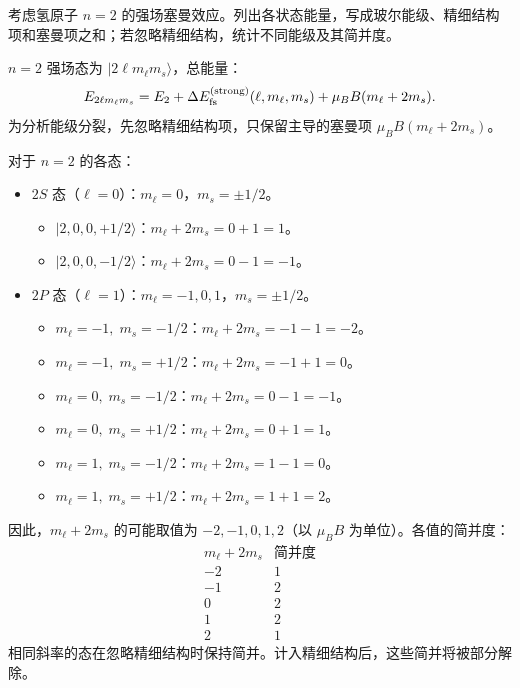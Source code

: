 \begin{question}
考虑氢原子 $n=2$ 的强场塞曼效应。列出各状态能量，写成玻尔能级、精细结构项和塞曼项之和；若忽略精细结构，统计不同能级及其简并度。
\end{question}
\begin{solution}
$n=2$ 强场态为 $|2\ell m_\ell m_s\rangle$，总能量：
\[
E_{2\ell m_\ell m_s}=E_2+\Delta E_{\rm fs}^{\rm(strong)}(\ell,m_\ell,m_s)+\mu_B B(m_\ell+2m_s).
\]
为分析能级分裂，先忽略精细结构项，只保留主导的塞曼项 $\mu_BB(m_\ell+2m_s)$。

对于 $n=2$ 的各态：
\begin{itemize}
\item $2S$ 态（$\ell=0$）：$m_\ell=0$，$m_s=\pm1/2$。
  \begin{itemize}
  \item $|2,0,0,+1/2\rangle$：$m_\ell+2m_s=0+1=1$。
  \item $|2,0,0,-1/2\rangle$：$m_\ell+2m_s=0-1=-1$。
  \end{itemize}
\item $2P$ 态（$\ell=1$）：$m_\ell=-1,0,1$，$m_s=\pm1/2$。
  \begin{itemize}
  \item $m_\ell=-1,\;m_s=-1/2$：$m_\ell+2m_s=-1-1=-2$。
  \item $m_\ell=-1,\;m_s=+1/2$：$m_\ell+2m_s=-1+1=0$。
  \item $m_\ell=0,\;m_s=-1/2$：$m_\ell+2m_s=0-1=-1$。
  \item $m_\ell=0,\;m_s=+1/2$：$m_\ell+2m_s=0+1=1$。
  \item $m_\ell=1,\;m_s=-1/2$：$m_\ell+2m_s=1-1=0$。
  \item $m_\ell=1,\;m_s=+1/2$：$m_\ell+2m_s=1+1=2$。
  \end{itemize}
\end{itemize}

因此，$m_\ell+2m_s$ 的可能取值为 $-2,-1,0,1,2$（以 $\mu_BB$ 为单位）。各值的简并度：
\[
\begin{array}{c|c}
m_\ell+2m_s & \text{简并度}\\ \hline
-2 & 1\\
-1 & 2\\
0 & 2\\
1 & 2\\
2 & 1
\end{array}
\]
相同斜率的态在忽略精细结构时保持简并。计入精细结构后，这些简并将被部分解除。
\end{solution}

